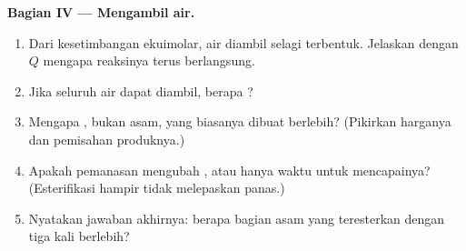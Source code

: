 \begin{problem}
\medskip
\noindent\textbf{Bagian IV --- Mengambil air.}
\begin{enumerate}[resume]
  \item Dari kesetimbangan ekuimolar, air diambil selagi terbentuk.
        Jelaskan dengan $Q$ mengapa reaksinya terus berlangsung.
  \item Jika seluruh air dapat diambil, berapa ?
  \item Mengapa , bukan asam, yang biasanya dibuat berlebih?
        (Pikirkan harganya dan pemisahan produknya.)
  \item Apakah pemanasan  mengubah , atau hanya
        waktu untuk mencapainya? (Esterifikasi hampir tidak melepaskan
        panas.)
  \item Nyatakan jawaban akhirnya: berapa bagian asam yang teresterkan
        dengan  tiga kali berlebih?
\end{enumerate}
\end{problem}
